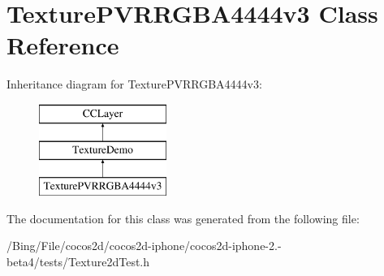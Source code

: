 \hypertarget{interface_texture_p_v_r_r_g_b_a4444v3}{\section{Texture\-P\-V\-R\-R\-G\-B\-A4444v3 Class Reference}
\label{interface_texture_p_v_r_r_g_b_a4444v3}
}
Inheritance diagram for Texture\-P\-V\-R\-R\-G\-B\-A4444v3\-:\begin{figure}[H]
\begin{center}
\leavevmode
\includegraphics[height=3.000000cm]{interface_texture_p_v_r_r_g_b_a4444v3}
\end{center}
\end{figure}


The documentation for this class was generated from the following file\-:\begin{DoxyCompactItemize}
\item 
/\-Bing/\-File/cocos2d/cocos2d-\/iphone/cocos2d-\/iphone-\/2.-\/beta4/tests/Texture2d\-Test.\-h\end{DoxyCompactItemize}
